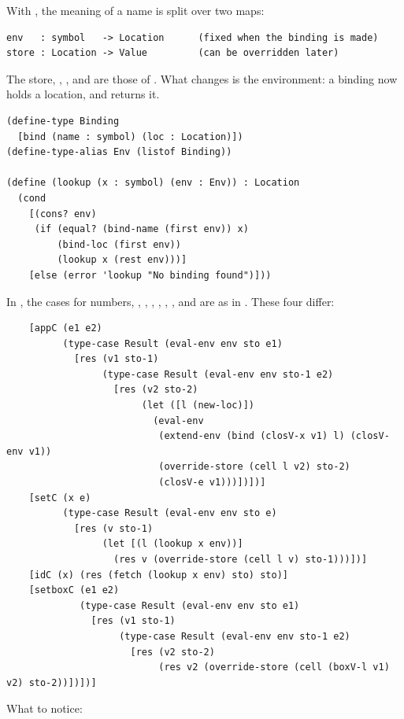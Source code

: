 With , the meaning of a name is split over two maps:
\begin{lstlisting}[style=repl]
env   : symbol   -> Location      (fixed when the binding is made)
store : Location -> Value         (can be overridden later)
\end{lstlisting}
The store, , , and  are those of . What changes is the environment: a binding now holds a location, and  returns it.
\begin{lstlisting}
(define-type Binding
  [bind (name : symbol) (loc : Location)])
(define-type-alias Env (listof Binding))

(define (lookup (x : symbol) (env : Env)) : Location
  (cond
    [(cons? env)
     (if (equal? (bind-name (first env)) x)
         (bind-loc (first env))
         (lookup x (rest env)))]
    [else (error 'lookup "No binding found")]))
\end{lstlisting}
In , the cases for numbers, , \code{+}, \code{*}, , , , and  are as in . These four differ:
\begin{lstlisting}
    [appC (e1 e2)
          (type-case Result (eval-env env sto e1)
            [res (v1 sto-1)
                 (type-case Result (eval-env env sto-1 e2)
                   [res (v2 sto-2)
                        (let ([l (new-loc)])
                          (eval-env
                           (extend-env (bind (closV-x v1) l) (closV-env v1))
                           (override-store (cell l v2) sto-2)
                           (closV-e v1)))])])]
    [setC (x e)
          (type-case Result (eval-env env sto e)
            [res (v sto-1)
                 (let [(l (lookup x env))]
                   (res v (override-store (cell l v) sto-1)))])]
    [idC (x) (res (fetch (lookup x env) sto) sto)]
    [setboxC (e1 e2)
             (type-case Result (eval-env env sto e1)
               [res (v1 sto-1)
                    (type-case Result (eval-env env sto-1 e2)
                      [res (v2 sto-2)
                           (res v2 (override-store (cell (boxV-l v1) v2) sto-2))])])]
\end{lstlisting}
What to notice:
